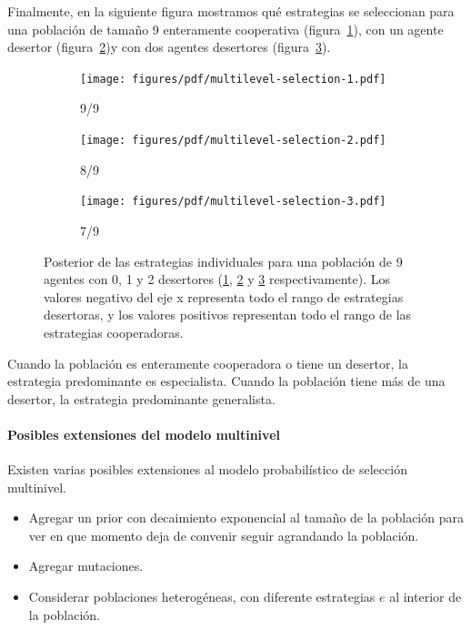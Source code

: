 \documentclass[a4paper,10pt]{article}
\begin{document}

Finalmente, en la siguiente figura mostramos qué estrategias se seleccionan para una población de tamaño 9 enteramente cooperativa (figura~\ref{fig:multilevel-selection-1}), con un agente desertor (figura~\ref{fig:multilevel-selection-2})y con dos agentes desertores (figura~\ref{fig:multilevel-selection-3}).
%
\begin{figure}[H]
    \centering
    \begin{subfigure}[b]{0.32\textwidth}
    \texttt{[image: figures/pdf/multilevel-selection-1.pdf]}
    \caption{9/9}
    \label{fig:multilevel-selection-1}
    \end{subfigure}
    \begin{subfigure}[b]{0.32\textwidth}
    \texttt{[image: figures/pdf/multilevel-selection-2.pdf]}
    \caption{8/9}
    \label{fig:multilevel-selection-2}
    \end{subfigure}
    \begin{subfigure}[b]{0.32\textwidth}
    \texttt{[image: figures/pdf/multilevel-selection-3.pdf]}
    \caption{7/9}
    \label{fig:multilevel-selection-3}
    \end{subfigure}
    \caption{
    Posterior de las estrategias individuales para una población de 9 agentes con 0, 1 y 2 desertores (\ref{fig:multilevel-selection-1}, \ref{fig:multilevel-selection-2} y \ref{fig:multilevel-selection-3} respectivamente).
    Los valores negativo del eje x representa todo el rango de estrategias desertoras, y los valores positivos representan todo el rango de las estrategias cooperadoras.
    }
    \label{fig:multilevel-selection-123}
\end{figure}
%
Cuando la población es enteramente cooperadora o tiene un desertor, la estrategia predominante es especialista.
Cuando la población tiene más de una desertor, la estrategia predominante generalista.


\paragraph{Posibles extensiones del modelo multinivel} Existen varias posibles extensiones al modelo probabilístico de selección multinivel.
\begin{itemize}
\item Agregar un prior con decaimiento exponencial al tamaño de la población para ver en que momento deja de convenir seguir agrandando la población.
\item Agregar mutaciones.
\item Considerar poblaciones heterogéneas, con diferente estrategias $e$ al interior de la población.
\end{itemize}
\end{document}
